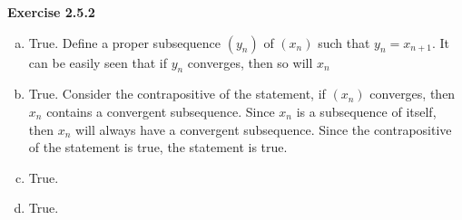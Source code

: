 \documentclass{article}
\begin{document}
  \textbf{Exercise 2.5.2}
  \begin{enumerate}[(a)]
  \item True. Define a proper subsequence \((y_{n})\) of \((x_{n})\) such that
    \(y_{n} = x_{n + 1}\). It can be easily seen that if \(y_{n}\) converges, then
    so will \(x_{n}\)
  \item True. Consider the contrapositive of the statement, if \((x_{n})\)
    converges, then \(x_{n}\) contains a convergent subsequence. Since \(x_{n}\)
    is a subsequence of itself, then \(x_{n}\) will always have a convergent
    subsequence. Since the contrapositive of the statement is true, the statement
    is true.
  \item True.
    \item True. 
   
  \end{enumerate}
  
\end{document}
